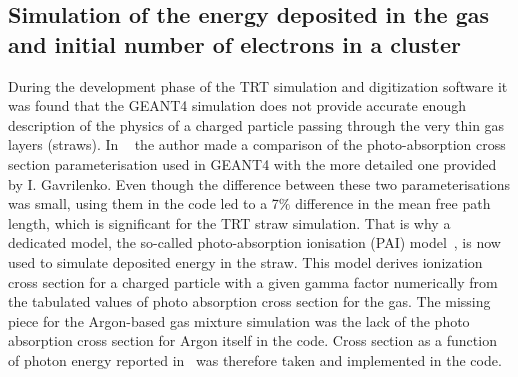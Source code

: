\subsection{Simulation of the energy deposited in the gas and initial number of electrons in a cluster}
\label{subsec:pai_model}
During the development phase of the TRT simulation and digitization software it was found that the GEANT4 simulation does not provide accurate enough description of the physics
of a charged particle passing through the very thin gas layers (straws). 
In ~\cite{kittelmann_thesis} the author made a comparison of the photo-absorption cross section parameterisation used in GEANT4 with the more detailed one provided by I. Gavrilenko.
Even though the difference between these two parameterisations was small, using them in the code led to a 7$\%$ difference in the mean free path length, which is significant for the TRT straw simulation.
That is why a dedicated model, the so-called photo-absorption ionisation (PAI) model~\cite{pai_model_paper}, is now used to simulate deposited energy in the straw.
This model derives ionization cross section for a charged particle with a given gamma factor numerically from the tabulated values of photo absorption cross section for the gas.
The missing piece for the Argon-based gas mixture simulation was the lack of the photo absorption cross section for Argon itself in the code.
Cross section as a function of photon energy reported in~\cite{argon_cross_section} was therefore taken and implemented in the code.


